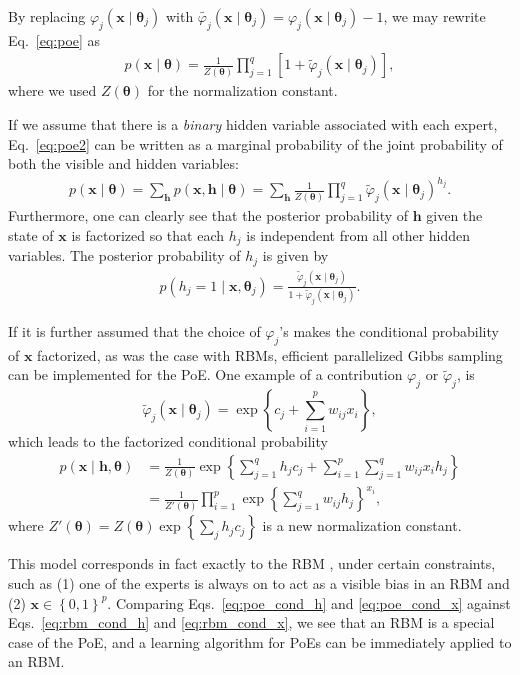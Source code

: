 \documentclass[dissertation,nocontribution,draft*]{aaltoseries}
\newcommand{\vect}[1]{\mathbf{#1}}
\newcommand{\vects}[1]{\boldsymbol{#1}}
\newcommand{\vh}[0]{\vect{h}}
\newcommand{\vx}[0]{\vect{x}}
\newcommand{\TT}[0]{{\vects{\theta}}}
\begin{document}
By replacing $\varphi_j(\vx \mid \TT_j)$ with
$\tilde{\varphi_j}(\vx \mid
\TT_j)=\varphi_j(\vx\mid\TT_j)-1$, we may rewrite
Eq.~\eqref{eq:poe} as
\begin{align}
    \label{eq:poe2}
    p(\vx \mid \TT) = \frac{1}{Z(\TT)}\prod_{j=1}^q \left[ 1 +
    \tilde{\varphi}_j(\vx \mid
    \TT_j)\right],
\end{align}
where we used $Z(\TT)$ for the normalization constant. 

If we assume that there is a \textit{binary} hidden variable
associated with each expert, Eq.~\eqref{eq:poe2} can be
written as a marginal probability of the joint
probability of both the visible and hidden variables:
\begin{align}
    \label{eq:poe2_joint}
    p(\vx \mid \TT) = \sum_{\vh} p(\vx, \vh \mid \TT) =
    \sum_{\vh} \frac{1}{Z(\TT)} \prod_{j=1}^q
    \tilde{\varphi}_j (\vx \mid \TT_j)^{h_j}.
\end{align}
Furthermore, one can clearly see that the posterior
probability of $\vh$ given the state of $\vx$ is factorized
so that each $h_j$ is independent from all other hidden
variables. The posterior probability of $h_j$ is given by
\begin{align}
    \label{eq:poe_cond_h}
    p(h_j = 1 \mid \vx, \TT_j) = \frac{\tilde{\varphi}_j(\vx
    \mid \TT_j)}{1 + \tilde{\varphi}_j(\vx \mid \TT_j)}.
\end{align}

If it is further assumed that the choice of $\varphi_j$'s
makes the conditional probability of $\vx$ 
factorized, as was the case with RBMs, efficient 
parallelized Gibbs sampling can be implemented for the PoE.
One example of a contribution $\varphi_j$ or
$\tilde{\varphi}_j$, is 
\[
\tilde{\varphi}_j(\vx \mid \TT_j) = \exp\left\{ c_j +
\sum_{i=1}^p w_{ij} x_i \right\},
\]
which leads to the factorized conditional probability
\begin{align}
    \label{eq:poe_cond_x}
p(\vx \mid \vh, \TT) &= \frac{1}{Z(\TT)} \exp\left\{
\sum_{j=1}^q h_j c_j + \sum_{i=1}^p \sum_{j=1}^q w_{ij} x_i
h_j \right\} 
\nonumber \\
&= \frac{1}{Z'(\TT)} \prod_{i=1}^p \exp\left\{
\sum_{j=1}^q w_{ij} h_j
\right\}^{x_i},
\end{align}
where $Z'(\TT) = Z(\TT) \exp\left\{ \sum_j h_j c_j \right\}$
is a new normalization constant.

This model corresponds in fact exactly to the RBM
\citep{Freund1994}, under
certain constraints, such as (1) one of the experts is
always on to act as a visible bias in an RBM and (2) $\vx
\in \left\{ 0, 1 \right\}^p$. Comparing
Eqs.~\eqref{eq:poe_cond_h} and \eqref{eq:poe_cond_x} against
Eqs.~\eqref{eq:rbm_cond_h} and \eqref{eq:rbm_cond_x}, we see
that an RBM
is a special case of the PoE, and a learning algorithm for
PoEs can be immediately applied to an RBM.
\end{document}
